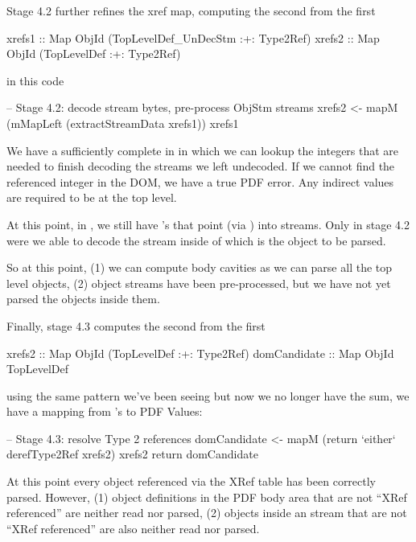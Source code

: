 Stage 4.2 further refines the xref map, computing the second from the first
\begin{codeNoExecute}
  xrefs1 :: Map ObjId (TopLevelDef_UnDecStm :+: Type2Ref)
  xrefs2 :: Map ObjId (TopLevelDef          :+: Type2Ref) 
\end{codeNoExecute}
in this code
\begin{code}
    -- Stage 4.2: decode stream bytes, pre-process ObjStm streams
    xrefs2 <- mapM
                (mMapLeft (extractStreamData xrefs1))
                xrefs1
\end{code}
We have a sufficiently complete  in  in which
we can lookup the integers that are needed to finish decoding the
streams we left undecoded.
If we cannot find the referenced integer in the DOM, we have a true PDF
error.  Any indirect  values are required to be at the
top level.

At this point, in , we still have 's that point
(via ) into  streams.
Only in stage 4.2 were we able to decode the stream inside of
which is the object to be parsed.


So at this point, (1) we can compute body cavities  as
we can parse all the top level objects, (2) object streams have been
pre-processed, but we have not yet parsed the objects inside them.

Finally, stage 4.3 computes the second from the first
\begin{codeNoExecute}
  xrefs2       :: Map ObjId (TopLevelDef :+: Type2Ref) 
  domCandidate :: Map ObjId TopLevelDef
\end{codeNoExecute}
using the same pattern we've been seeing but now we no longer have 
the sum, we have a mapping from 's to PDF Values:
\begin{code}
    -- Stage 4.3: resolve Type 2 references
    domCandidate <- mapM
                     (return `either` derefType2Ref xrefs2)
                     xrefs2
    return domCandidate
\end{code}

At this point every object referenced via the XRef table has been
correctly parsed. However, (1) object definitions in the PDF body
area that are not ``XRef referenced'' are neither read nor parsed,
% 
(2) objects inside an  stream that are not ``XRef
referenced'' are also neither read nor parsed.

